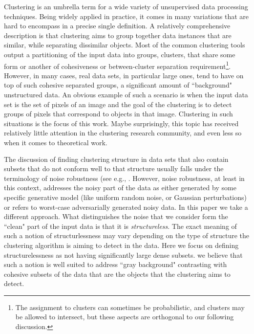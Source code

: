 \documentclass[anon,12pt]{colt2016} %
\begin{document}
Clustering is an umbrella term for a wide variety of unsupervised data processing techniques. Being widely applied in practice, it comes in many variations that are hard to encompass in a precise single definition. A relatively comprehensive description is  that clustering aims to group together data instances that are similar, while separating dissimilar objects. Most of the common clustering tools output a partitioning of the input data into groups, clusters, that share some form or another of cohesiveness or between-cluster separation requirement\footnote{The assignment to clusters can sometimes be probabilistic, and clusters may be allowed to intersect, but these aspects are orthogonal to our following discussion.}. However, in many cases, real data sets, in particular large ones, tend to have on top of such cohesive separated groups, a significant amount of 
``background" unstructured data. An obvious example of such a scenario is when the input data set is the set of pixels of an image and the goal of the clustering is to detect groups of pixels that correspond to objects in that image. Clustering in such situations is the focus of this work. Maybe surprisingly, this topic has received relatively little attention in the clustering research community, and even less so when it comes to theoretical work. 

The discussion of finding clustering structure in data sets that also contain subsets that do not conform well to that structure usually falls under the terminology of noise robustness (see e.g., \cite{balcan2012clustering, ackerman2009clusterability, ackerman2009clusterability,
cuesta1997trimmed, dave1993robust, garcia2008general}. However, noise robustness, at least in this context, addresses the noisy part of the data as either generated by some specific generative model (like uniform random noise, or Gaussian perturbations) or refers to worst-case adversarially generated noisy data. In this paper we take a different approach. What distinguishes the noise that we consider form the ``clean" part of the input data is that it is \emph{structureless}. The exact meaning of such a notion of structurlessness may vary depending on the type of structure the clustering algorithm is aiming to detect in the data. Here we focus on
defining structurelessness as  not having significantly large dense subsets. we believe that such a notion is well suited to address ``gray background" contrasting with cohesive subsets of the data that are the objects that the clustering aims to detect. 
\end{document}
